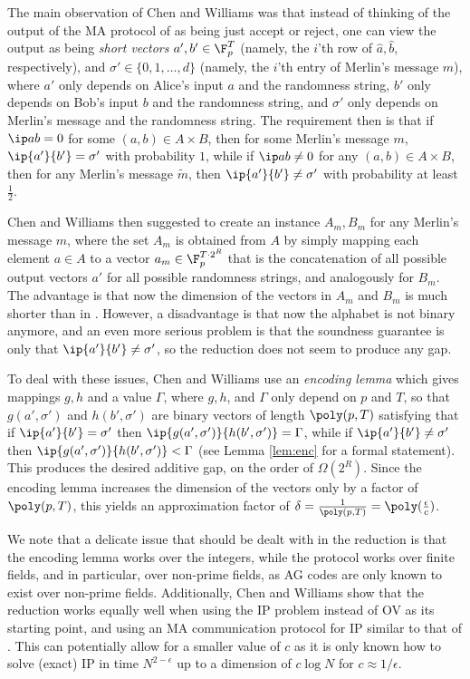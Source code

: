 \documentclass[11pt]{article}
\begin{document}
The main observation of Chen and Williams was that instead of thinking of the output of the MA protocol of  \cite{Rub18} as being just accept or reject, one can view the output as being \emph{short vectors} $a',b' \in \F_p^T$ (namely, the $i$'th row of $\hat a, \hat b$, respectively), and $\sigma' \in \{0,1,\ldots, d\}$ (namely, the $i$'th entry of Merlin's message $m$), where $a'$ only depends on Alice's input $a$ and the randomness string, $b'$ only depends on Bob's input $b$ and the randomness string, and $\sigma'$ only depends on Merlin's message and the randomness string. The requirement then is that if $\ip a b =0$ for some $(a,b) \in A \times B$,
then for some Merlin's message $m$,
$\ip {a'} {b'} = \sigma'$ with probability $1$, while if $\ip a b \neq 0$ for any $(a,b) \in A \times B$,
then for any Merlin's message $\tilde m$,
then $\ip {a'} {b'} \neq \sigma'$ with probability at least $\frac 1 2$. 


Chen and Williams then suggested to create an instance $A_m, B_m$  for any Merlin's message $m$, where the set $A_m$  is obtained from $A$ by simply mapping each element $a \in A$ to a vector $a_m \in \F_p^{T \cdot 2^R}$ that is the concatenation of all possible output vectors $a'$ for all possible randomness strings, and analogously for $B_m$. The advantage is that now 
the dimension of the vectors in $A_m$ and $B_m$ is much shorter than in  
\cite{Rub18}. However,  a disadvantage is that now the alphabet is not binary anymore, and an even more serious problem is that the soundness guarantee is only that $\ip {a'} {b'} \neq \sigma'$, so the reduction does not seem to produce any gap.


To deal with these issues, Chen and Williams use an \emph{encoding lemma} which gives mappings $g,h$ and a value $\Gamma$, where $g,h$, and $\Gamma$ only depend on $p$ and $T$, so that $g(a',\sigma')$ and $h(b',\sigma')$ are binary vectors of length $\poly(p, T)$ satisfying that if $\ip {a'} {b'} = \sigma'$ then $\ip {g(a',\sigma')} {h(b',\sigma')} =\Gamma$, while if $\ip {a'} {b'} \neq \sigma'$ then $\ip {g(a',\sigma')} {h(b',\sigma')} < \Gamma$ (see Lemma \ref{lem:enc} for a formal statement). This produces the desired additive gap, on the order of $\Omega(2^R)$. Since the encoding lemma increases the dimension of the vectors only by a factor of $\poly(p,T)$, this yields an approximation factor of $\delta =\frac{1} {\poly(p,T)}=  \poly(\frac \epsilon c)$.

We note that a delicate issue that should be dealt with in the reduction is that the encoding lemma works over the integers, while the protocol works over finite fields, and in particular, over non-prime fields, as AG codes are only known to exist over non-prime fields. Additionally, Chen and Williams show that the reduction works equally well when using the IP problem instead of OV as its starting point, and using an MA communication protocol for IP similar to that of \cite{AW09}. This can potentially allow for a smaller value of $c$ as it is only known how to solve (exact) IP in time 
 $N^{2-\epsilon}$ up to a dimension of $c \log N$ for $c \approx 1/\epsilon$. 
\end{document}

